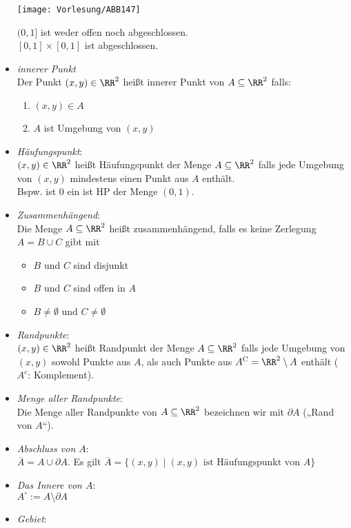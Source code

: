 \begin{itemize}
\begin{center}
\texttt{[image: Vorlesung/ABB147]}
\end{center}
$(0,1]$ ist weder offen noch abgeschlossen.\\
$[0,1]\times[0,1]$ ist abgeschlossen.
\item \emph{innerer Punkt}\\
Der Punkt $(x,y)\in \RR^2$ heißt innerer Punkt von $A \subseteq \RR^2$ falls:
\begin{enumerate}
\item $(x,y) \in A$
\item $A$ ist Umgebung von $(x,y)$
\end{enumerate}
\item \emph{Häufungspunkt}:\\
$(x,y) \in \RR^2$ heißt Häufungspunkt der Menge $A\subseteq \RR^2$ falls jede Umgebung von $(x,y)$ mindestens einen Punkt aus $A$ enthält.\\
Bspw. ist $0$ ein ist HP der Menge $(0,1)$.
\item \emph{Zusammenhängend}:\\
Die Menge $A\subseteq \RR^2$ heißt zusammenhängend, falls es keine Zerlegung $A=B\cup C$ gibt mit 
\begin{itemize}
\item $B$ und $C$ sind disjunkt
\item $B$ und $C$ sind offen in $A$
\item $B \not = \emptyset$ und $C\not = \emptyset$
\end{itemize} 
\item \emph{Randpunkte}:\\
$(x,y) \in \RR^2$ heißt Randpunkt der Menge $A \subseteq \RR^2$ falls jede Umgebung von $(x,y)$ sowohl Punkte aus $A$, als auch Punkte aus $A^{\mathrm{C}}=\RR^2 \setminus A$ enthält ($A^c$: Komplement).
\item \emph{Menge aller Randpunkte}:\\
Die Menge aller Randpunkte von $A\subseteq \RR^2$ bezeichnen wir mit $\partial A$ („Rand von $A$“). 
\item \emph{Abschluss von $A$}:\\
$\overline{A}=A \cup \partial A$. Es gilt $\overline{A}=\{ (x,y) \;|\; (x,y) \text{ ist Häufungspunkt von }A\}$
\item \emph{Das Innere von $A$}: \\
$A^\circ:= A \setminus \partial A$
\item \emph{Gebiet}:\\

\end{itemize}
